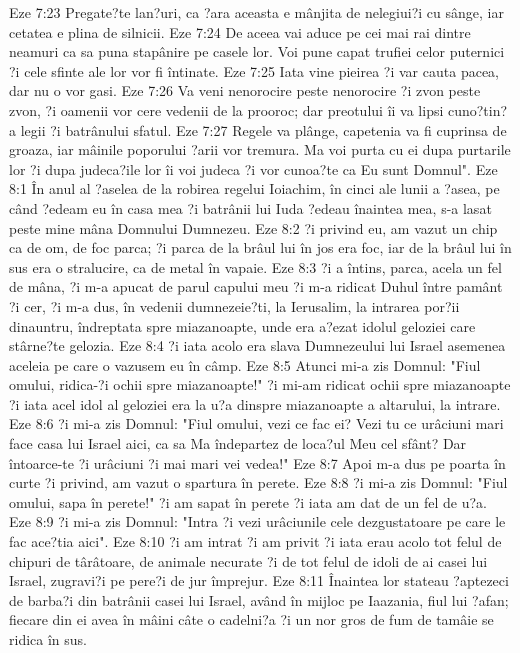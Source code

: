 Eze 7:23  Pregate?te lan?uri, ca ?ara aceasta e mânjita de nelegiui?i cu sânge, iar cetatea e plina de silnicii.
Eze 7:24  De aceea vai aduce pe cei mai rai dintre neamuri ca sa puna stapânire pe casele lor. Voi pune capat trufiei celor puternici ?i cele sfinte ale lor vor fi întinate.
Eze 7:25  Iata vine pieirea ?i var cauta pacea, dar nu o vor gasi.
Eze 7:26  Va veni nenorocire peste nenorocire ?i zvon peste zvon, ?i oamenii vor cere vedenii de la prooroc; dar preotului îi va lipsi cuno?tin?a legii ?i batrânului sfatul.
Eze 7:27  Regele va plânge, capetenia va fi cuprinsa de groaza, iar mâinile poporului ?arii vor tremura. Ma voi purta cu ei dupa purtarile lor ?i dupa judeca?ile lor îi voi judeca ?i vor cunoa?te ca Eu sunt Domnul".
Eze 8:1  În anul al ?aselea de la robirea regelui Ioiachim, în cinci ale lunii a ?asea, pe când ?edeam eu în casa mea ?i batrânii lui Iuda ?edeau înaintea mea, s-a lasat peste mine mâna Domnului Dumnezeu.
Eze 8:2  ?i privind eu, am vazut un chip ca de om, de foc parca; ?i parca de la brâul lui în jos era foc, iar de la brâul lui în sus era o stralucire, ca de metal în vapaie.
Eze 8:3  ?i a întins, parca, acela un fel de mâna, ?i m-a apucat de parul capului meu ?i m-a ridicat Duhul între pamânt ?i cer, ?i m-a dus, în vedenii dumnezeie?ti, la Ierusalim, la intrarea por?ii dinauntru, îndreptata spre miazanoapte, unde era a?ezat idolul geloziei care stârne?te gelozia.
Eze 8:4  ?i iata acolo era slava Dumnezeului lui Israel asemenea aceleia pe care o vazusem eu în câmp.
Eze 8:5  Atunci mi-a zis Domnul: "Fiul omului, ridica-?i ochii spre miazanoapte!" ?i mi-am ridicat ochii spre miazanoapte ?i iata acel idol al geloziei era la u?a dinspre miazanoapte a altarului, la intrare.
Eze 8:6  ?i mi-a zis Domnul: "Fiul omului, vezi ce fac ei? Vezi tu ce urâciuni mari face casa lui Israel aici, ca sa Ma îndepartez de loca?ul Meu cel sfânt? Dar întoarce-te ?i urâciuni ?i mai mari vei vedea!"
Eze 8:7  Apoi m-a dus pe poarta în curte ?i privind, am vazut o spartura în perete.
Eze 8:8  ?i mi-a zis Domnul: "Fiul omului, sapa în perete!" ?i am sapat în perete ?i iata am dat de un fel de u?a.
Eze 8:9  ?i mi-a zis Domnul: "Intra ?i vezi urâciunile cele dezgustatoare pe care le fac ace?tia aici".
Eze 8:10  ?i am intrat ?i am privit ?i iata erau acolo tot felul de chipuri de târâtoare, de animale necurate ?i de tot felul de idoli de ai casei lui Israel, zugravi?i pe pere?i de jur împrejur.
Eze 8:11  Înaintea lor stateau ?aptezeci de barba?i din batrânii casei lui Israel, având în mijloc pe Iaazania, fiul lui ?afan; fiecare din ei avea în mâini câte o cadelni?a ?i un nor gros de fum de tamâie se ridica în sus.
